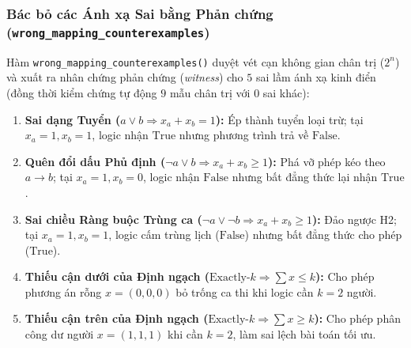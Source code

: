 \subsubsection{Bác bỏ các Ánh xạ Sai bằng Phản chứng (\texttt{wrong\_\allowbreak mapping\_\allowbreak counterexamples})}
Hàm \texttt{wrong\_\allowbreak mapping\_\allowbreak counterexamples()} duyệt vét cạn không gian chân trị ($2^n$) và xuất ra nhân chứng phản chứng (\textit{witness}) cho $5$ sai lầm ánh xạ kinh điển (đồng thời kiểm chứng tự động $9$ mẫu chân trị với $0$ sai khác):
\begin{enumerate}
    \item \textbf{Sai dạng Tuyển ($a \lor b \Rightarrow x_a + x_b = 1$):} Ép thành tuyển loại trừ; tại $x_a = 1, x_b = 1$, logic nhận $\text{True}$ nhưng phương trình trả về $\text{False}$.
    \item \textbf{Quên đổi dấu Phủ định ($\neg a \lor b \Rightarrow x_a + x_b \ge 1$):} Phá vỡ phép kéo theo $a \to b$; tại $x_a = 1, x_b = 0$, logic nhận $\text{False}$ nhưng bất đẳng thức lại nhận $\text{True}$.
    \item \textbf{Sai chiều Ràng buộc Trùng ca ($\neg a \lor \neg b \Rightarrow x_a + x_b \ge 1$):} Đảo ngược H2; tại $x_a = 1, x_b = 1$, logic cấm trùng lịch ($\text{False}$) nhưng bất đẳng thức cho phép ($\text{True}$).
    \item \textbf{Thiếu cận dưới của Định ngạch ($\text{Exactly-}k \Rightarrow \sum x \le k$):} Cho phép phương án rỗng $x = (0,0,0)$ bỏ trống ca thi khi logic cần $k=2$ người.
    \item \textbf{Thiếu cận trên của Định ngạch ($\text{Exactly-}k \Rightarrow \sum x \ge k$):} Cho phép phân công dư người $x = (1,1,1)$ khi cần $k=2$, làm sai lệch bài toán tối ưu.
\end{enumerate}
\FloatBarrier